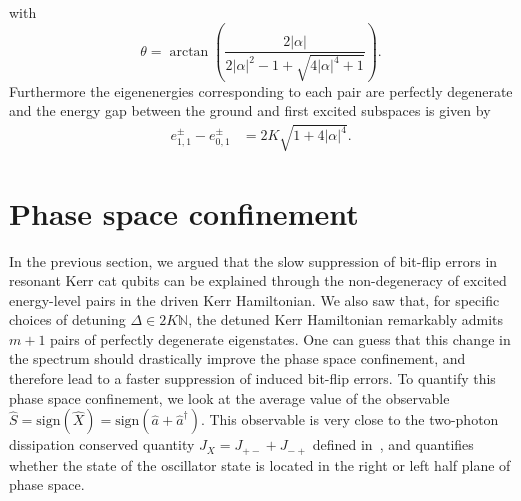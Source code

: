 \documentclass[%
 reprint,
 superscriptaddress,
 amsmath,
 amssymb,
 aps,
 pra,
 10pt
]{revtex4-2}
\begin{document}
with
\begin{equation*}
\theta=\arctan\left(\frac{2|\alpha|}{2|\alpha|^2-1+\sqrt{4|\alpha|^4+1}}\right).
\end{equation*}
Furthermore the eigenenergies corresponding to each pair are perfectly degenerate and the energy gap between the ground and first excited subspaces is given by
\begin{equation}
    \begin{split}
        e^\pm_{1,1}-e^\pm_{0,1}  &= 2 K \sqrt{1+4|\alpha|^4}.
    \end{split}
\end{equation}


\section{\label{sec:level4}Phase space confinement}

In the previous section, we argued that the slow suppression of bit-flip errors in resonant Kerr cat qubits can be explained through the non-degeneracy of excited energy-level pairs in the driven Kerr Hamiltonian. We also saw that, for specific choices of detuning $\Delta \in 2K\mathbb{N}$, the detuned Kerr Hamiltonian remarkably admits $m+1$ pairs of perfectly degenerate eigenstates. One can guess that this change in the spectrum should drastically improve the phase space confinement, and therefore lead to a faster suppression of induced bit-flip errors. To quantify this phase space confinement, we look at the average value of the observable $\hat S=\text{sign}(\hat X)=\text{sign}(\hat a+\hat a^\dag)$. This observable is very close to the two-photon dissipation conserved quantity $J_X=J_{+-}+J_{-+}$ defined in~\cite{Mirrahimi2014}, and quantifies whether the state of the oscillator state is located in the right or left half plane of phase space.  
\end{document}
